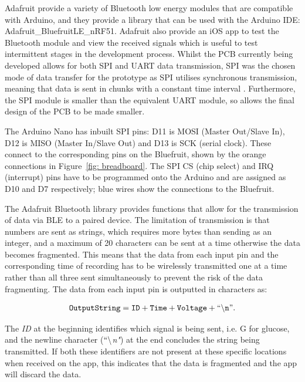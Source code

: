 Adafruit provide a variety of Bluetooth low energy modules that are compatible with Arduino, and they provide a library that can be used with the Arduino IDE: Adafruit\_BluefruitLE\_nRF51. Adafruit also provide an iOS app to test the Bluetooth module and view the received signals which is useful to test intermittent stages in the development process. Whilst the PCB currently being developed allows for both SPI and UART data transmission, SPI was the chosen mode of data transfer for the prototype as SPI utilises synchronous transmission, meaning that data is sent in chunks with a constant time interval \cite{teachcomputerscience2018}. Furthermore, the SPI module is smaller than the equivalent UART module, so allows the final design of the PCB to be made smaller.

The Arduino Nano has inbuilt SPI pins: D11 is MOSI (Master Out/Slave In), D12 is MISO (Master In/Slave Out) and D13 is SCK (serial clock). These connect to the corresponding pins on the Bluefruit, shown by the orange connections in Figure~\ref{fig: breadboard}. The SPI CS (chip select) and IRQ (interrupt) pins have to be programmed onto the Arduino and are assigned as D10 and D7 respectively; blue wires show the connections to the Bluefruit.

The Adafruit Bluetooth library provides functions that allow for the transmission of data via BLE to a paired device. The limitation of transmission is that numbers are sent as strings, which requires more bytes than sending as an integer, and a maximum of 20 characters can be sent at a time \cite{Townsend2018} otherwise the data becomes fragmented. This means that the data from each input pin and the corresponding time of recording has to be wirelessly transmitted one at a time rather than all three sent simultaneously to prevent the risk of the data fragmenting. The data from each input pin is outputted in characters as:

\begin{align}
    \tt{OutputString = ID + Time + Voltage + ``\backslash n"}.
    \nonumber
\end{align}

The \textit{ID} at the beginning identifies which signal is being sent, i.e. G for glucose, and the newline character (\textit{$``\backslash$n"}) at the end concludes the string being transmitted. If both these identifiers are not present at these specific locations when received on the app, this indicates that the data is fragmented and the app will discard the data. 

